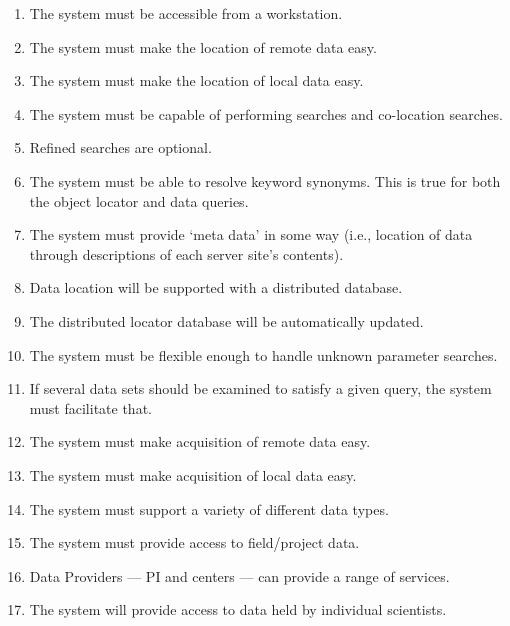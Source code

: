 \begin{enumerate}

\item The system must be accessible from a workstation.

\item The system must make the location of remote data easy.

\item The system must make the location of local data easy.
 
\item The system must be capable of performing searches and co-location
searches. 

\item Refined searches are optional.

\item The system must be able to resolve keyword synonyms. This is true for
both the object locator and data queries.

\item The system must provide `meta data' in some way (i.e., location of data
through descriptions of each server site's contents).

\item Data location will be supported with a distributed database.

\item The distributed locator database will be automatically updated.

\item The system must be flexible enough to handle unknown parameter searches.

\item If several data sets should be examined to satisfy a given query, the
system must facilitate that.

\item The system must make acquisition of remote data easy.

\item The system must make acquisition of local data easy.
 
\item The system must support a variety of different data types.

\item The system must provide access to field/project data.

\item Data Providers --- PI and centers --- can provide a range of services.

\item The system will provide access to data held by individual scientists.   


\end{enumerate}
